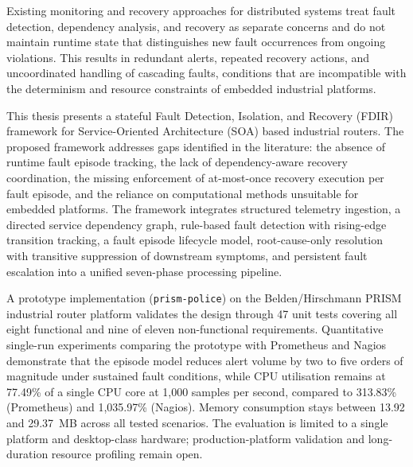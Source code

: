 Existing monitoring and recovery approaches for distributed systems treat fault detection, dependency analysis, and recovery as separate concerns and do not maintain runtime state that distinguishes new fault occurrences from ongoing violations. This results in redundant alerts, repeated recovery actions, and uncoordinated handling of cascading faults, conditions that are incompatible with the determinism and resource constraints of embedded industrial platforms.

This thesis presents a stateful Fault Detection, Isolation, and Recovery (FDIR) framework for Service-Oriented Architecture (SOA) based industrial routers. The proposed framework addresses gaps identified in the literature: the absence of runtime fault episode tracking, the lack of dependency-aware recovery coordination, the missing enforcement of at-most-once recovery execution per fault episode, and the reliance on computational methods unsuitable for embedded platforms. The framework integrates structured telemetry ingestion, a directed service dependency graph, rule-based fault detection with rising-edge transition tracking, a fault episode lifecycle model, root-cause-only resolution with transitive suppression of downstream symptoms, and persistent fault escalation into a unified seven-phase processing pipeline.

A prototype implementation (\texttt{prism-police}) on the Belden/Hirschmann PRISM industrial router platform validates the design through 47 unit tests covering all eight functional and nine of eleven non-functional requirements. Quantitative single-run experiments comparing the prototype with Prometheus and Nagios demonstrate that the episode model reduces alert volume by two to five orders of magnitude under sustained fault conditions, while CPU utilisation remains at 77.49\% of a single CPU core at 1{,}000 samples per second, compared to 313.83\% (Prometheus) and 1{,}035.97\% (Nagios). Memory consumption stays between 13.92 and 29.37~MB across all tested scenarios. The evaluation is limited to a single platform and desktop-class hardware; production-platform validation and long-duration resource profiling remain open.
